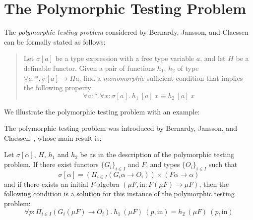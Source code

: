 \documentclass{llncs}
\begin{document}


\section{The Polymorphic Testing Problem}

The {\em polymorphic testing problem} considered by Bernardy, Jansson,
and Claessen can be formally stated as follows:

\begin{verse}\label{problem:poly-testing}
  \hspace*{0.2in}Let $\sigma[a]$ be a type expression with a free
  type variable $a$, and let $H$ be a definable functor. Given a
  pair of functions $h_1$, $h_2$ of type $\forall a :
  *.~\sigma[a] \to H a$, find a \emph{monomorphic} sufficient
  condition that implies the following property:
  \begin{equation}
    \label{eq:problem}
    \forall a : *. \forall x : \sigma[a].~h_1~[a]~x \equiv h_2~[a]~x
  \end{equation}
\end{verse}

\begin{example}
  We illustrate the polymorphic testing problem with an example:

\end{example}

The polymorphic testing problem was introduced by Bernardy, Jansson,
and Claessen~\cite{bjc10}, whose main result is:

\begin{theorem}\label{thm:poly-testing}
Let $\sigma[\alpha]$, $H$, $h_1$ and $h_2$ be as in the description of
the polymorphic testing problem. If there exist functors $\{G_i\}_{i
  \in I}$ and $F$, and types $\{O_i\}_{i \in I}$ such that
\begin{displaymath}
  \sigma[\alpha] = \left( \Pi_{i \in I} (G_i \alpha \to O_i)\right) 
  \times  (F \alpha \to \alpha)
\end{displaymath}
and if there exists an initial $F$-algebra $(\mu F, \mathrm{in} : F(\mu
F) \to \mu F)$, then the following condition is a solution for this
instance of the polymorphic testing problem:
\begin{equation}
  \label{eq:solution-pt}
  \forall p : \Pi_{i \in I}(G_i(\mu F) \to O_i).~h_1~(\mu F)~(p,
  \mathrm{in}) = h_2~(\mu F)~(p, \mathrm{in})
\end{equation}
\end{theorem}
\end{document}
